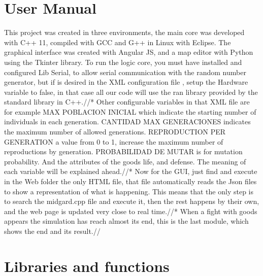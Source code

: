 \documentclass[twocolumn]{IEEEtran}
\begin{document}
\section{User Manual}

This project was created in three environments, the main core was developed with C++ 11, compiled with GCC and G++ in Linux with Eclipse. The graphical interface was created with Angular JS, and a map editor with Python using the Tkinter library. 
To run the logic core, you must have installed and configured Lib Serial, to allow serial communication with the random number generator, but if is desired in the XML configuration file , setup the Hardware variable to false, in that case all our code will use the ran library provided by the standard library in C++.//*
Other configurable variables in that XML file are for example MAX POBLACION INICIAL which indicate the starting number of individuals in each generation. CANTIDAD MAX GENERACIONES indicates the maximum number of allowed generations. REPRODUCTION PER GENERATION a value from 0 to 1, increase the maximum number of reproductions by generation. PROBABILIDAD DE MUTAR is for mutation probability. And the attributes of the goods life, and defense. The meaning of each variable will be explained ahead.//*
Now for the GUI, just find and execute in the Web folder the only HTML file, that file automatically reads the Json files to show a representation of what is happening. This means that the only step is to search the midgard.cpp file and execute it, then the rest happens by their own, and the web page is updated very close to real time.//*
When a fight with goods appears the simulation has reach almost its end, this is the last module, which shows the end and its result.//

\section{Libraries and functions}
\end{document}
